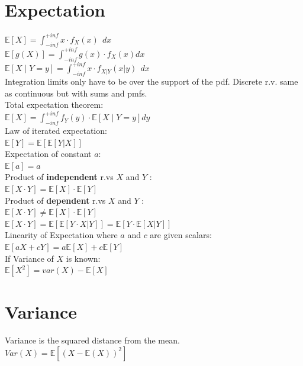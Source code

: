\section{Expectation}

$\mathbb{E}\left[X\right]=\int_{-inf}^{+inf}{x \cdot f_X\left(x\right)\ \ dx}$\\
$\mathbb{E}\left[g\left(X\right)\right]=\int_{-inf}^{+inf}{g\left(x\right) \cdot f_X\left(x\right)dx}$\\
$\mathbb{E}\left[X\middle| Y=y\right]=\int_{-inf}^{+inf}{x \cdot { f}_{X|Y}\left(x|y\right)\ \ dx}$\\
Integration limits only have to be over the support of the pdf. Discrete r.v. same as continuous but with sums and pmfs.\\
Total expectation theorem:\\
$\mathbb{E}\left[X\right]=\int_{-inf}^{+inf}{f_Y\left(y\right)\cdot\mathbb{E}\left[X\middle| Y=y\right]dy}$\\
Law of iterated expectation:\\
$\mathbb E[Y] = \mathbb E[\mathbb E[Y\rvert {X}]]$\\
Expectation of constant $a$:\\
$\mathbb{E}[a] = a$\\
Product of \textbf{independent} r.vs $X$ and $Y$ :\\
$\mathbb{E}[X \cdot Y] = \mathbb{E}[X] \cdot \mathbb{E}[Y]$\\
Product of \textbf{dependent} r.vs $X$ and $Y$ :\\
$\mathbb{E}[X \cdot Y] \neq \mathbb{E}[X] \cdot \mathbb{E}[Y]$\\
$\mathbb{E}[X \cdot Y] = \mathbb{E}[\mathbb{E}[Y \cdot X|Y]] = \mathbb{E}[Y \cdot \mathbb{E}[X|Y]]$\\
Linearity of Expectation where $a$ and $c$ are given scalars:\\
$\mathbb{E}[aX + c Y] = a\mathbb{E}[X] + c\mathbb{E}[Y]$\\
If Variance of $X$ is known:\\
$\mathbb{E}[X^2] = var(X) - \mathbb{E}[X]$\\

\section{Variance}

Variance is the squared distance from the mean.\\

$Var(X)=\mathbb{E}[(X-\mathbb{E}(X))^2]$\\

